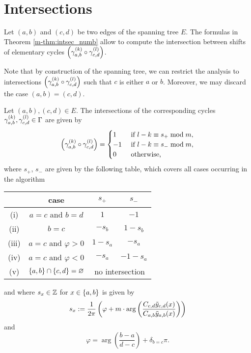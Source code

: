 \documentclass[main.tex]{subfiles}
\begin{document}
  \section{Intersections}\label{sec:intersections}

   Let $(a,b)$ and $(c,d)$ be two edges of the spanning tree $E$.
  The formulas in Theorem \ref{m-thm:intsec_numb} allow to compute the intersection
  between shifts of elementary cycles $\left(\gamma_{a,b}^{(k)} \circ \gamma_{c,d}^{(l)}\right)$.

  Note that by construction of the spanning tree,
  we can restrict the analysis to intersections $\left(\gamma_{a,b}^{(k)} \circ \gamma_{c,d}^{(l)}\right)$
  such that $c$ is either $a$ or $b$. Moreover, we may discard the case $(a,b)=(c,d)$.

   \begin{thm}\label{thm:intsec_numb}
      Let $(a,b),(c,d) \in E$. The intersections of the corresponding cycles $\gamma_{a,b}^{(k)}, \gamma_{c,d}^{(l)} \in \Gamma$ are given by
      \begin{equation*}
          \left(\gamma_{a,b}^{(k)} \circ \gamma_{c,d}^{(l)}\right)
          = \begin{cases}
              1  &\text{ if } l-k \equiv s_+ \bmod m,\\
              -1 &\text{ if } l-k \equiv s_- \bmod m,\\
              0 &\text{ otherwise,}
          \end{cases}
      \end{equation*}
      where $s_+$, $s_-$ are given by the following table, which covers all
      cases occurring in the algorithm
      \begin{center}
          \normalfont
      \begin{tabular}{cccc}
          \toprule
          & case & $s_+$ & $s_-$ \\
          \midrule
         (i) & $a=c$ and $b=d$ & $1$ & $-1$ \\
         (ii) & $b=c$ & $-s_b$ & $1-s_b$ \\
         (iii) & $a=c$ and $\varphi>0$ & $1-s_a$ & $-s_a$ \\
         (iv) & $a=c$ and $\varphi<0$ & $-s_a$ & $-1-s_a$\\
         (v) & $\left\{a,b\right\}\cap\left\{c,d\right\}=\varnothing$ & \multicolumn{2}{c}{no intersection} \\
          \bottomrule
      \end{tabular}
      \end{center}
      and where $s_x \in \mathbb{Z}$ for $x\in\left\{a,b\right\}$ is given by
      \begin{equation*}\label{eq:s_x}
	    s_x := \frac{1}{2\pi}\left( \varphi + m \cdot \arg \left( \frac{C_{c,d} \tilde{y}_{c,d}(x)}{C_{a,b}\tilde{y}_{a,b}(x)} \right)
	    \right)
      \end{equation*}
     and
      \begin{equation*}
          \varphi = \arg \left( \frac{b-a}{d-c} \right) + \delta_{b=c}\pi.
      \end{equation*}
 \end{thm}
\end{document}
